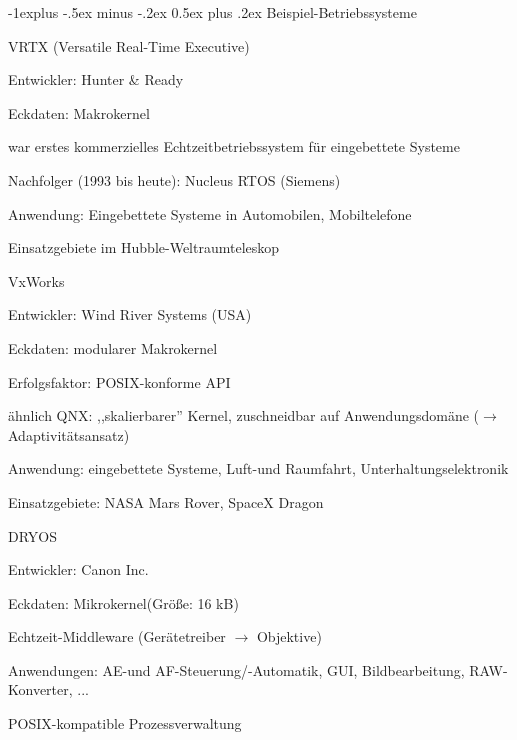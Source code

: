\documentclass[a4paper]{article}
\makeatletter
\renewcommand{\subsection}{\@startsection{subsection}{2}{0mm}%
 {-1explus -.5ex minus -.2ex}%
 {0.5ex plus .2ex}%
 {\normalfont\normalsize\bfseries}}
\makeatother
\begin{document}
\begin{multicols}{3}
    \subsection{Beispiel-Betriebssysteme}

    VRTX (Versatile Real-Time Executive)
    \begin{itemize*}
        \item Entwickler: Hunter \& Ready
        \item Eckdaten: Makrokernel
        \item war erstes kommerzielles Echtzeitbetriebssystem für eingebettete Systeme
        \item Nachfolger (1993 bis heute): Nucleus RTOS (Siemens)
        \item Anwendung: Eingebettete Systeme in Automobilen, Mobiltelefone
        \item Einsatzgebiete im Hubble-Weltraumteleskop
    \end{itemize*}

    VxWorks
    \begin{itemize*}
        \item Entwickler: Wind River Systems (USA)
        \item Eckdaten: modularer Makrokernel
        \item Erfolgsfaktor: POSIX-konforme API
        \item ähnlich QNX: ,,skalierbarer'' Kernel, zuschneidbar auf Anwendungsdomäne ($\rightarrow$ Adaptivitätsansatz)
        \item Anwendung: eingebettete Systeme, Luft-und Raumfahrt, Unterhaltungselektronik
        \item Einsatzgebiete: NASA Mars Rover, SpaceX Dragon
    \end{itemize*}

    DRYOS
    \begin{itemize*}
        \item Entwickler: Canon Inc.
        \item Eckdaten: Mikrokernel(Größe: 16 kB)
        \item Echtzeit-Middleware (Gerätetreiber $\rightarrow$ Objektive)
        \item Anwendungen: AE-und AF-Steuerung/-Automatik, GUI, Bildbearbeitung, RAW-Konverter, ...
        \item POSIX-kompatible Prozessverwaltung
    \end{itemize*}


\end{multicols}
\end{document}
